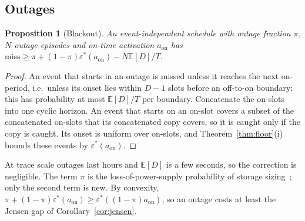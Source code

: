 \documentclass[lettersize,journal]{IEEEtran}
\newtheorem{proposition}{Proposition}
\theoremstyle{definition}
\theoremstyle{remark}
\newcommand{\eps}{\varepsilon}
\newcommand{\E}{\mathbb{E}}
\begin{document}
\subsection{Outages}\label{sec:blackout}
\begin{proposition}[Blackout]\label{prop:blackout}
An event-independent schedule with outage fraction $\pi$, $N$ outage episodes and on-time activation $a_{\mathrm{on}}$ has $\mathrm{miss}\ge\pi+(1-\pi)\eps^*(a_{\mathrm{on}})-N\E[D]/T$.
\end{proposition}
\begin{proof}
An event that starts in an outage is missed unless it reaches the next on-period, i.e.\ unless its onset lies within $D-1$ slots before an off-to-on boundary; this has probability at most $\E[D]/T$ per boundary. Concatenate the on-slots into one cyclic horizon. An event that starts on an on-slot covers a subset of the concatenated on-slots that its concatenated copy covers, so it is caught only if the copy is caught. Its onset is uniform over on-slots, and Theorem~\ref{thm:floor}(i) bounds these events by $\eps^*(a_{\mathrm{on}})$.
\end{proof}
\noindent At trace scale outages last hours and $\E[D]$ is a few seconds, so the correction is negligible. The term $\pi$ is the loss-of-power-supply probability of storage sizing~\cite{borowy1996lpsp}; only the second term is new. By convexity, $\pi+(1-\pi)\eps^*(a_{\mathrm{on}})\ge\eps^*((1-\pi)a_{\mathrm{on}})$, so an outage costs at least the Jensen gap of Corollary~\ref{cor:jensen}.
\end{document}

